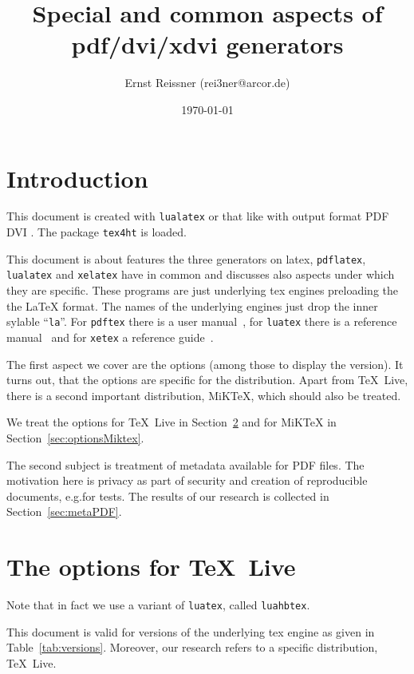 \documentclass[a4paper, english]{article}%
\title{Special and common aspects of pdf/dvi/xdvi generators }
\author{Ernst Reissner (rei3ner@arcor.de)}
\date{\today}
\newcommand{\pdflatex}{\texttt{pdflatex}}
\newcommand{\lualatex}{\texttt{lualatex}}
\newcommand{\xelatex}{\texttt{xelatex}}
\newcommand{\texlive}{\TeX~Live}
\newcommand{\miktex}{MiKTeX}
\begin{document}
\maketitle
\tableofcontents
\listoftables

\section{Introduction}

This document is created with \lualatex{} or that like 
with output format 
\ifpdf%
PDF%
\else
DVI%
\fi.
The package \texttt{tex4ht} 
is  loaded. 

This document is about features the three generators on latex, 
\pdflatex, \lualatex{} and \xelatex{} have in common 
and discusses also aspects under which they are specific. 
These programs are just underlying tex engines preloading the the \LaTeX{} format. 
The names of the underlying engines just drop the inner sylable ``\texttt{la}''. 
For \texttt{pdftex} there is a user manual~\cite{PdfTexUsr}, 
for \texttt{luatex} there is a reference manual~\cite{LuaTexRef24} and 
for \texttt{xetex} a reference guide~\cite{XeTexRef}. 

The first aspect we cover are the options (among those to display the version). 
It turns out, that the options are specific for the distribution. 
Apart from \texlive{}, there is a second important distribution, \miktex, 
which should also be treated. 

We treat the options for \texlive{} in Section~\ref{sec:optionsTexlive} 
and for \miktex{} in Section~\ref{sec:optionsMiktex}. 

The second subject is treatment of metadata available for PDF files. 
The motivation here is privacy as part of security 
and creation of reproducible documents, e.g.\@ for tests. 
The results of our research is collected in Section~\ref{sec:metaPDF}. 

\section{The options for \texlive}\label{sec:optionsTexlive}


Note that in fact we use a variant of \texttt{luatex}, called \texttt{luahbtex}. 

This document is valid for versions of the underlying tex engine 
as given in Table~\ref{tab:versions}. 
Moreover, our research refers to a specific distribution, \texlive. 
\end{document}

